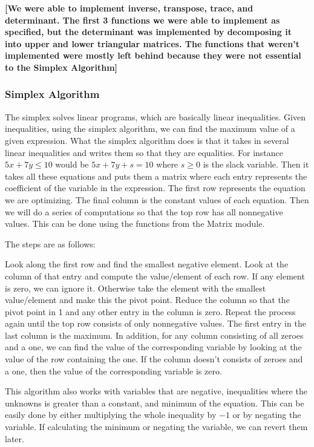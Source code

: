 \documentclass[letterpaper,11pt]{article}
\newcommand{\annot}[1]{\textbf{\color{BrickRed} [#1]}}
\begin{document}
{\annot{We were able to implement inverse, transpose, trace, and determinant.
The first 3 functions we were able to implement as specified, but the
determinant was implemented by decomposing it into upper and lower triangular
matrices. The functions that weren't implemented were mostly left behind because
they were not essential to the Simplex Algorithm}}

\subsubsection{Simplex Algorithm}

The simplex solves linear programs, which are basically linear inequalities.
Given inequalities, using the simplex algorithm, we can find the maximum value
of a given expression. What the simplex algorithm does is that it takes in
several linear inequalities and writes them so that they are equalities. For
instance $5x + 7y \leq 10$ would be $5x + 7y + s = 10$ where $s \geq 0$ is the
slack variable. Then it takes all these equations and puts them a matrix where
each entry represents the coefficient of the variable in the expression. The
first row represents the equation we are optimizing. The final column is the
constant values of each equation. Then we will do a series of computations so
that the top row has all nonnegative values. This can be done using the
functions from the Matrix module. 

The steps are as follows:

Look along the first row and find the smallest negative element. Look at the
column of that entry and compute the value/element of each row. If any element
is zero, we can ignore it. Otherwise take the element with the smallest
value/element and make this the pivot point. Reduce the column so that the pivot
point in 1 and any other entry in the column is zero. Repeat the process again
until the top row consists of only nonnegative values. The first entry in the
last column is the maximum. In addition, for any column consisting of all zeroes
and a one, we can find the value of the corresponding variable by looking at the
value of the row containing the one. If the column doesn't consists of zeroes
and a one, then the value of the corresponding variable is zero. 

This algorithm also works with variables that are negative, inequalities where
the unknowns is greater than a constant, and minimum of the equation. This can
be easily done by either multiplying the whole inequality by $-1$ or by negating
the variable. If calculating the minimum or negating the variable, we can revert
them later.  
\end{document}
